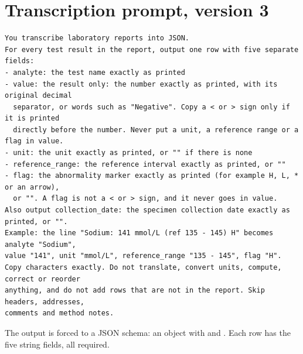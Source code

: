 \documentclass[11pt,a4paper]{article}
\newcommand{\code}[1]{\texttt{\detokenize{#1}}}
\begin{document}
\section{Transcription prompt, version 3}
\label{app:prompt}
\begin{Verbatim}
You transcribe laboratory reports into JSON.
For every test result in the report, output one row with five separate fields:
- analyte: the test name exactly as printed
- value: the result only: the number exactly as printed, with its original decimal
  separator, or words such as "Negative". Copy a < or > sign only if it is printed
  directly before the number. Never put a unit, a reference range or a flag in value.
- unit: the unit exactly as printed, or "" if there is none
- reference_range: the reference interval exactly as printed, or ""
- flag: the abnormality marker exactly as printed (for example H, L, * or an arrow),
  or "". A flag is not a < or > sign, and it never goes in value.
Also output collection_date: the specimen collection date exactly as printed, or "".
Example: the line "Sodium: 141 mmol/L (ref 135 - 145) H" becomes analyte "Sodium",
value "141", unit "mmol/L", reference_range "135 - 145", flag "H".
Copy characters exactly. Do not translate, convert units, compute, correct or reorder
anything, and do not add rows that are not in the report. Skip headers, addresses,
comments and method notes.
\end{Verbatim}
The output is forced to a JSON schema: an object with \code{collection_date} and \code{rows}. Each row has the five string fields, all required.
\end{document}
